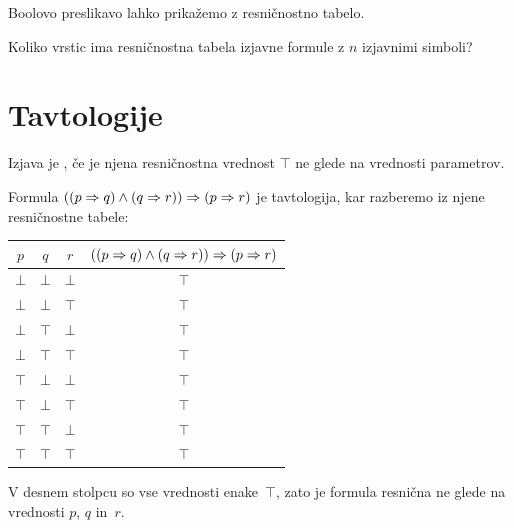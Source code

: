 Boolovo preslikavo lahko prikažemo z resničnostno tabelo.

\begin{vaja}
  Koliko vrstic ima resničnostna tabela izjavne formule z $n$ izjavnimi simboli?
\end{vaja}


\section{Tavtologije}

Izjava je , če je njena resničnostna vrednost $\top$ ne glede na
vrednosti parametrov.

\begin{zgled}
  Formula $((p \Rightarrow q) \land (q \Rightarrow r)) \Rightarrow (p \Rightarrow r)$ je tavtologija,
  kar razberemo iz njene resničnostne tabele:
  \begin{center}
    \small
    \begin{tabular}{cccc}
      \toprule
      $p$ & $q$ & $r$ & $((p \Rightarrow q) \land (q \Rightarrow r)) \Rightarrow (p \Rightarrow r)$ \\
      \midrule
      $\bot$ & $\bot$ & $\bot$ & $\top$ \\
      $\bot$ & $\bot$ & $\top$ & $\top$ \\
      $\bot$ & $\top$ & $\bot$ & $\top$ \\
      $\bot$ & $\top$ & $\top$ & $\top$ \\
      $\top$ & $\bot$ & $\bot$ & $\top$ \\
      $\top$ & $\bot$ & $\top$ & $\top$ \\
      $\top$ & $\top$ & $\bot$ & $\top$ \\
      $\top$ & $\top$ & $\top$ & $\top$ \\
      \bottomrule
    \end{tabular}
  \end{center}
  V desnem stolpcu so vse vrednosti enake~$\top$, zato je formula resnična ne glede na vrednosti $p$, $q$ in~$r$.
\end{zgled}


